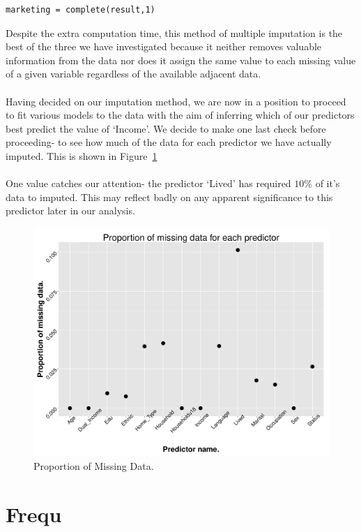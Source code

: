\documentclass{article}
\begin{document}
\begin{verbatim}
marketing = complete(result,1)
\end{verbatim}
Despite the extra computation time, this method of multiple imputation is the best of the three we have investigated because it neither removes valuable information from the data nor does it assign the same value to each missing value of a given variable regardless of the available adjacent data.
\\\\
Having decided on our imputation method, we are now in a position to proceed to fit various models to the data with the aim of inferring which of our predictors best predict the value of `Income'. We decide to make one last check before proceeding- to see how much of the data for each predictor we have actually imputed. This is shown in Figure~\ref{Proportion}
\\\\
One value catches our attention- the predictor `Lived' has required $10\%$ of it's data to imputed. This may reflect badly on any apparent significance to this predictor later in our analysis.
\begin{figure}[h!]
  \centering
  \includegraphics[width=1.0\textwidth]{HandlingMissingData/PropMissingData.pdf}
  \caption{Proportion of Missing Data.}
  \label{Proportion}
\end{figure}


\section{Frequ}
\end{document}

